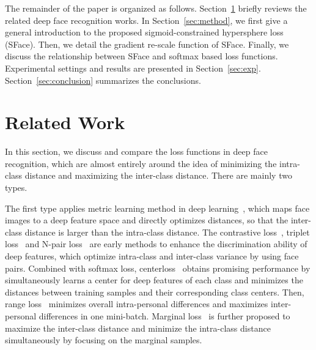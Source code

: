 \documentclass[journal,comsoc]{IEEEtran}
\begin{document}
The remainder of the paper is organized as follows. Section~\ref{sec:related} briefly reviews the related deep face recognition works. In Section~\ref{sec:method}, we first give a general introduction to the proposed sigmoid-constrained hypersphere loss (SFace). Then, we detail the gradient re-scale function of SFace. Finally, we discuss the relationship between SFace and softmax based loss functions. Experimental settings and results are presented in Section~\ref{sec:exp}. Section~\ref{sec:conclusion} summarizes the conclusions.




\section{Related Work}
\label{sec:related}
In this section, we discuss and compare the loss functions in deep face recognition, which are almost entirely around the idea of minimizing the intra-class distance and maximizing the inter-class distance. There are mainly two types. 

The first type applies metric learning method in deep learning~\cite{Sun2014Deep,Schroff2015FaceNet,Wen2016A}, which maps face images to a deep feature space and directly optimizes distances, so that the inter-class distance is larger than the intra-class distance. The contrastive loss~\cite{Sun2014Deep}, triplet loss~\cite{Schroff2015FaceNet} and N-pair loss~\cite{sohn2016improved} are early methods to enhance the discrimination ability of deep features, which optimize intra-class and inter-class variance by using face pairs. Combined with softmax loss, centerloss~\cite{Wen2016A} obtains promising performance by simultaneously learns a center for deep features of each class and minimizes the distances between training samples and their corresponding
class centers. Then, range loss~\cite{Zhang2017rangeloss} minimizes overall intra-personal differences and maximizes inter-personal differences in one mini-batch. Marginal loss~\cite{Deng2017Marginal} is further proposed to maximize the inter-class distance and minimize the intra-class distance simultaneously by focusing on the marginal samples. 
\end{document}
